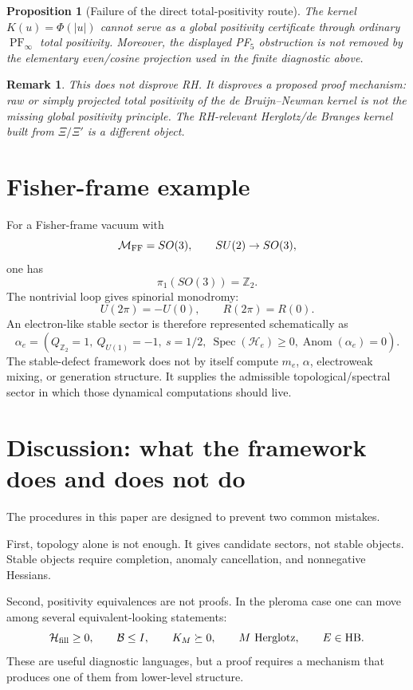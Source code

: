 \documentclass[11pt]{article}
\newtheorem{proposition}[theorem]{Proposition}
\newtheorem{remark}[theorem]{Remark}
\DeclareMathOperator{\Spec}{Spec}
\DeclareMathOperator{\Anom}{Anom}
\DeclareMathOperator{\PF}{PF}
\newcommand{\Hess}{\mathcal H}
\newcommand{\M}{\mathcal M}
\newcommand{\Z}{\mathbb Z}
\begin{document}
\begin{proposition}[Failure of the direct total-positivity route]
The kernel $K(u)=\Phi(|u|)$ cannot serve as a global positivity certificate through ordinary $\PF_\infty$ total positivity. Moreover, the displayed PF$_5$ obstruction is not removed by the elementary even/cosine projection used in the finite diagnostic above.
\end{proposition}

\begin{remark}
This does not disprove RH. It disproves a proposed proof mechanism: raw or simply projected total positivity of the de Bruijn--Newman kernel is not the missing global positivity principle. The RH-relevant Herglotz/de Branges kernel built from $\Xi/\Xi'$ is a different object.
\end{remark}

\section{Fisher-frame example}

For a Fisher-frame vacuum with
\[
        \M_{\rm FF}=SO(3),
        \qquad
        SU(2)\to SO(3),
\]
one has
\[
        \pi_1(SO(3))=\Z_2.
\]
The nontrivial loop gives spinorial monodromy:
\[
        U(2\pi)=-U(0),
        \qquad
        R(2\pi)=R(0).
\]
An electron-like stable sector is therefore represented schematically as
\[
\boxed{
        \alpha_e=(Q_{\Z_2}=1,\ Q_{U(1)}=-1,\ s=1/2,\ \Spec(\Hess_e)\ge0,
        \Anom(\alpha_e)=0).
}
\]
The stable-defect framework does not by itself compute $m_e$, $\alpha$, electroweak mixing, or generation structure. It supplies the admissible topological/spectral sector in which those dynamical computations should live.

\section{Discussion: what the framework does and does not do}

The procedures in this paper are designed to prevent two common mistakes.

First, topology alone is not enough. It gives candidate sectors, not stable objects. Stable objects require completion, anomaly cancellation, and nonnegative Hessians.

Second, positivity equivalences are not proofs. In the pleroma case one can move among several equivalent-looking statements:
\[
\Hess_{\rm fill}\ge0,
\qquad
\mathcal B\le I,
\qquad
K_M\succeq0,
\qquad
M\text{ Herglotz},
\qquad
E\in\mathrm{HB}.
\]
These are useful diagnostic languages, but a proof requires a mechanism that produces one of them from lower-level structure.
\end{document}
